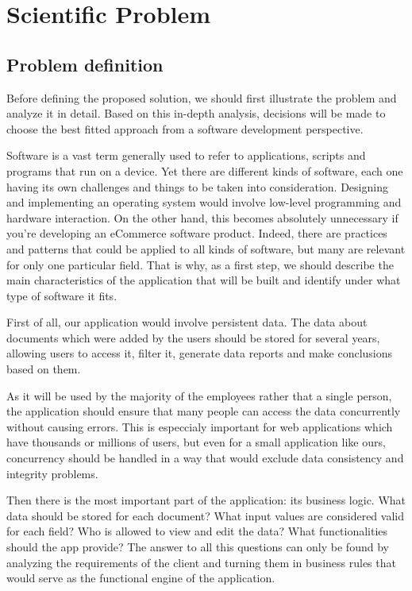 \chapter{Scientific Problem}
\label{section:scientificProblem}



\section{Problem definition}
\label{section:problemDefinition}

Before defining the proposed solution, we should first illustrate the problem and analyze it in detail. Based on this in-depth analysis, decisions will be made to choose the best fitted approach from a software development perspective.

Software is a vast term generally used to refer to applications, scripts and programs that run on a device. Yet there are different kinds of software, each one having its own challenges and things to be taken into consideration. Designing and implementing an operating system would involve low-level programming and hardware interaction. On the other hand, this becomes absolutely unnecessary if you're developing an eCommerce software product. Indeed, there are practices and patterns that could be applied to all kinds of software, but many are relevant for only one particular field. That is why, as a first step, we should describe the main characteristics of the application that will be built and identify under what type of software it fits.

First of all, our application would involve persistent data. The data about documents which were added by the users should be stored for several years, allowing users to access it, filter it, generate data reports and make conclusions based on them.

As it will be used by the majority of the employees rather that a single person, the application should ensure that many people can access the data concurrently without causing errors. This is especcialy important for web applications which have thousands or millions of users, but even for a small application like ours, concurrency should be handled in a way that would exclude data consistency and integrity problems.

Then there is the most important part of the application: its business logic. What data should be stored for each document? What input values are considered valid for each field? Who is allowed to view and edit the data? What functionalities should the app provide? The answer to all this questions can only be found by analyzing the requirements of the client and turning them in business rules that would serve as the functional engine of the application.

